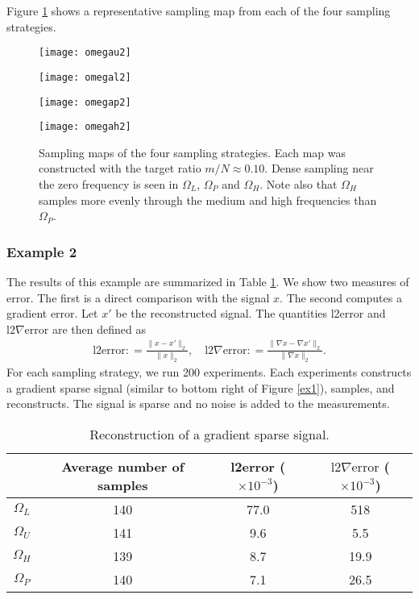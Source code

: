 \documentclass[11pt, oneside]{article}   %
\newcommand{\norm}[1]{\lVert #1 \rVert}
\newcommand{\defined}{\mathrel{\mathop:}=}
\begin{document}
Figure \ref{sampling maps} shows a representative sampling map from each of the four sampling strategies. 
\begin{figure}
        \centering
\begin{minipage}{.45\textwidth}
     \texttt{[image: omegau2]}
\end{minipage}
\begin{minipage}{.45\textwidth}
      \texttt{[image: omegal2]}
\end{minipage}
\begin{minipage}{.45\textwidth}
     \texttt{[image: omegap2]}
\end{minipage}
\begin{minipage}{.45\textwidth}
      \texttt{[image: omegah2]}
\end{minipage}
\caption{Sampling maps of the four sampling strategies. Each map was constructed with the target ratio $m/N \approx 0.10$. Dense sampling near the zero frequency is seen in $\Omega_L$, $\Omega_P$ and $\Omega_H$. Note also that $\Omega_H$ samples more evenly through the medium and high frequencies than $\Omega_P$.}
\label{sampling maps}
\end{figure}

\subsubsection{Example 2}
The results of this example are summarized in Table \ref{1d summary}. We show two measures of error. The first is a direct comparison with the signal $x$. The second computes a gradient error. Let $x'$ be the reconstructed signal. The quantities l2error and $\mathrm{l2}\nabla\mathrm{error}$ are then defined as 
\begin{align*}
        \mathrm{l2error} \defined \frac{\norm{x - x'}_2}{\norm{x}_2}, 
\quad 
\mathrm{l2}\nabla\mathrm{error} \defined \frac{\norm{\nabla x - \nabla x'}_2}{\norm{\nabla x}_2}.
\end{align*}
For each sampling strategy, we run 200 experiments. Each experiments constructs a gradient sparse signal (similar to bottom right of Figure \ref{ex1}), samples, and reconstructs. The signal is sparse and no noise is added to the measurements.

\begin{table}
        \centering
\begin{tabular}{c|ccc}
        & Average number of samples & l2error ($\times 10^{-3}$) & $\mathrm{l2}\nabla\mathrm{error}$ ($\times 10^{-3}$) \\ \hline
$\Omega_L$ & 140 & 77.0 & 518 \\
$\Omega_U$ & 141& 9.6 & 5.5\\
$\Omega_H$ & 139 & 8.7 & 19.9 \\ 
$\Omega_P$ & 140 & 7.1 & 26.5
\end{tabular}
\caption{Reconstruction of a gradient sparse signal.}
\label{1d summary}
\end{table}
\end{document}
